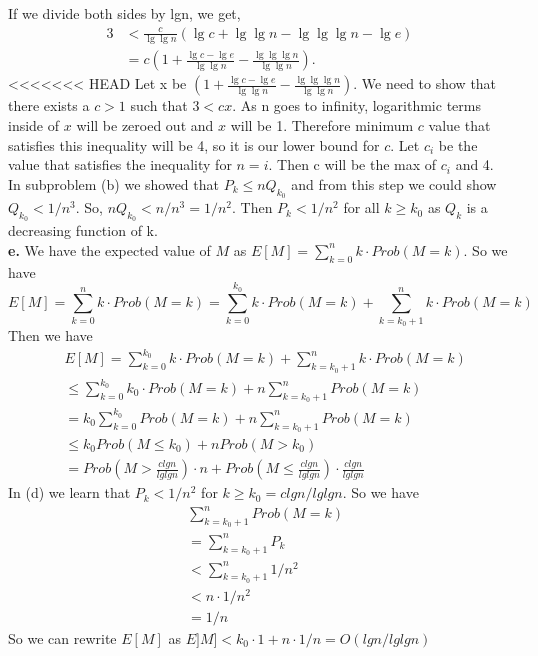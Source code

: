 \documentclass{article}
\begin{document}
If we divide both sides by lgn, we get, 
\begin{align*}
3 &< \frac{c}{\lg\lg n}(\lg c + \lg\lg n - \lg\lg\lg n - \lg e) \\
&= c(1 + \frac{\lg c - \lg e}{\lg\lg n} - \frac{\lg\lg\lg n}{\lg\lg n}).
\end{align*}
<<<<<<< HEAD
Let x be $(1 + \frac{\lg c - \lg e}{\lg\lg n} - \frac{\lg\lg\lg n}{\lg\lg n})$. We need to show that there exists a $c > 1$ such that $3 < cx$. As n goes to infinity, logarithmic terms inside of $x$ will be zeroed out and $x$ will be 1. Therefore minimum $c$ value that satisfies this inequality will be 4, so it is our lower bound for $c$. Let $c_i$ be the value that satisfies the inequality for $n = i$. Then c will be the max of $c_i$ and 4. \\ \newline
In subproblem (b) we showed that $P_k \leq nQ_{k_0}$ and from this step we could show $Q_{k_0} < 1/n^3$. So, $nQ_{k_0} < n/n^3 = 1/n^2$. Then $P_k < 1/n^2$ for all $k \geq k_0$ as $Q_k$ is a decreasing function of k. \\ \newline
\textbf{e.} We have the expected value of $M$ as 
$E[M] = \sum_{k=0}^nk\cdot Prob(M = k)$. So we have 
$$E[M] = \sum_{k=0}^nk\cdot Prob(M = k) = \sum_{k = 0}^{k_{0}}k\cdot Prob(M = k) + \sum_{k = k_0+1}^nk\cdot Prob(M = k)$$
Then we have 
\begin{align*}
&E[M]=\sum_{k = 0}^{k_{0}}k\cdot Prob(M = k) + \sum_{k = k_0+1}^nk\cdot Prob(M = k) \\
&\leq \sum_{k = 0}^{k_{0}}k_0\cdot Prob(M = k) + n\sum_{k = k_0+1}^nProb(M = k)\\
&= k_0\sum_{k = 0}^{k_{0}}Prob(M = k) + n\sum_{k = k_0+1}^nProb(M = k)\\
&\leq k_0Prob(M \leq k_0) + nProb(M > k_0)\\
&= Prob(M > \frac{clgn}{lglgn})\cdot n + Prob(M\leq \frac{clgn}{lglgn})\cdot \frac{clgn}{lglgn}
\end{align*}
In (d) we learn that $P_k < 1/n^2$ for $k \geq k_0 = clgn/lglgn$. So we have
\begin{align*}
&\sum_{k = k_0+1}^nProb(M = k) \\
&=\sum_{k = k_0+1}^nP_k \\
&< \sum_{k = k_0+1}^n1/n^2 \\
&< n\cdot 1/n^2\\
&=1/n
\end{align*}
So we can rewrite $E[M]$ as $E]M] < k_0 \cdot 1 + n\cdot 1/n = O(lgn/lglgn)$
\end{document}
